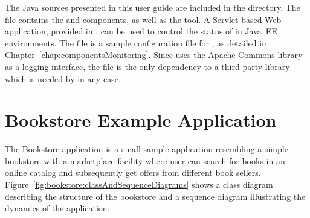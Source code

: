 The Java sources presented in this user guide are included in the %
\file{\exampleDir/} directory. %
The file \file{\mainJar{}} contains the \KiekerMonitoringPart{} and %
\KiekerAnalysisPart{} components, as well as the \KiekerTraceAnalysis{} tool. %
A Servlet-based Web application, provided in \file{\servletWar}, can be used %
to control the status of \KiekerMonitoringPart{} in Java~EE %
environments. The file \file{\kiekerMonitoringProperties{}} is a sample configuration %
file for \KiekerMonitoringPart{}, as detailed in Chapter~\ref{chap:componentsMonitoring}. %
Since \Kieker{} uses the Apache Commons library~\cite{CommonsLogging-WebSite} %
as a logging interface, the file \file{\commonsLoggingJar} is the only dependency %
to a third-party library which is needed by \Kieker{} in any case. 

\section{Bookstore Example Application}\label{sec:example:bookstore}

The Bookstore application is a small sample application resembling a simple %
bookstore with a marketplace facility where user can search for books in an %
online catalog and subsequently get offers from different book sellers. %
Figure~\ref{fig:bookstore:classAndSequenceDiagrams} shows %
a class diagram describing the structure of the bookstore and %
a sequence diagram illustrating the dynamics of the application. 

